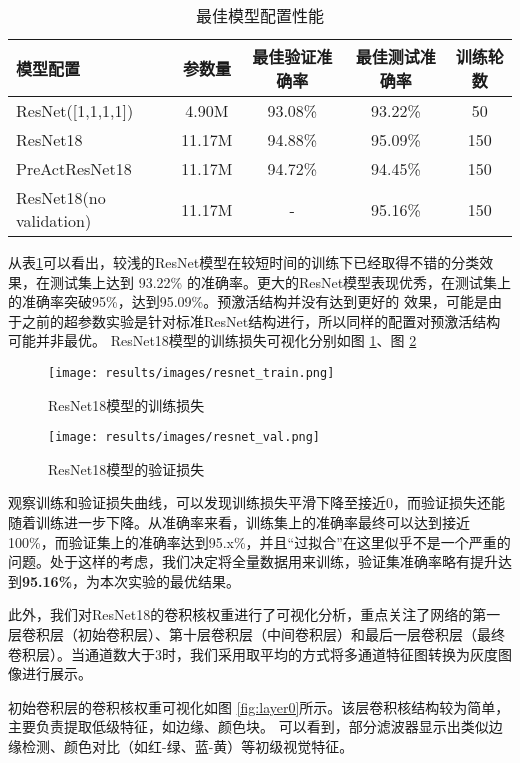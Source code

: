\documentclass[12pt,a4paper]{article}
\begin{document}
\begin{table}[htbp]
\centering
\caption{最佳模型配置性能}
\label{tab:best_model}
\begin{tabular}{lcccc}
\toprule
\textbf{模型配置} & \textbf{参数量} & \textbf{最佳验证准确率} & \textbf{最佳测试准确率} & \textbf{训练轮数} \\
\midrule
ResNet([1,1,1,1]) & 4.90M & 93.08\% & 93.22\% & 50 \\
ResNet18 & 11.17M & 94.88\% & 95.09\% & 150 \\
PreActResNet18 & 11.17M & 94.72\% & 94.45\% & 150 \\
ResNet18(no validation) & 11.17M & - & 95.16\% & 150 \\
\bottomrule
\end{tabular}
\end{table}

从表\ref{tab:best_model}可以看出，较浅的ResNet模型在较短时间的训练下已经取得不错的分类效果，在测试集上达到
93.22\% 的准确率。更大的ResNet模型表现优秀，在测试集上的准确率突破95\%，达到95.09\%。预激活结构并没有达到更好的
效果，可能是由于之前的超参数实验是针对标准ResNet结构进行，所以同样的配置对预激活结构可能并非最优。
ResNet18模型的训练损失可视化分别如图 \ref{fig:resnet_train}、图 \ref{fig:resnet_val}
\begin{figure}[htbp]
    \centering
    \texttt{[image: results/images/resnet\_train.png]}
\caption{ResNet18模型的训练损失}
    \label{fig:resnet_train}
\end{figure}

\begin{figure}[htbp]
    \centering
    \texttt{[image: results/images/resnet\_val.png]}
\caption{ResNet18模型的验证损失}
    \label{fig:resnet_val}
\end{figure}

观察训练和验证损失曲线，可以发现训练损失平滑下降至接近0，而验证损失还能随着训练进一步下降。从准确率来看，训练集上的准确率最终可以达到接近100\%，而验证集上的准确率达到95.x\%，并且“过拟合”在这里似乎不是一个严重的问题。处于这样的考虑，我们决定将全量数据用来训练，验证集准确率略有提升达到\textbf{95.16\%}，为本次实验的最优结果。

此外，我们对ResNet18的卷积核权重进行了可视化分析，重点关注了网络的第一层卷积层（初始卷积层）、第十层卷积层（中间卷积层）和最后一层卷积层（最终卷积层）。当通道数大于3时，我们采用取平均的方式将多通道特征图转换为灰度图像进行展示。

初始卷积层的卷积核权重可视化如图 \ref{fig:layer0}所示。该层卷积核结构较为简单，主要负责提取低级特征，如边缘、颜色块。
可以看到，部分滤波器显示出类似边缘检测、颜色对比（如红-绿、蓝-黄）等初级视觉特征。
\end{document}
